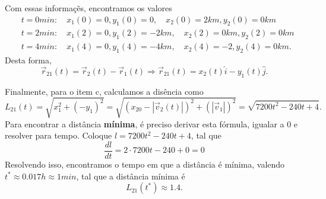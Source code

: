 \documentclass[PhysicsI/physics_notes.tex]{subfiles}
\begin{document}
\begin{example}
	Com essas informaç\~es, encontramos os valores
	\begin{align*}
		 & t = 0min:\quad x_{1}(0) = 0, y_{1}(0) = 0,\quad x_{2}(0) = 2km, y_{2}(0) = 0km    \\
		 & t = 2min:\quad x_{1}(2) = 0, y_{1}(2) = -2km,\quad x_{2}(2) = 0km, y_{2}(2) = 0km \\
		 & t = 4min:\quad x_{1}(4) = 0, y_{1}(4) = -4km,\quad x_{2}(4) = -2, y_{2}(4) = 0km.
	\end{align*}
	Desta forma,
	$$
		\vec{r}_{21}(t) = \vec{r}_{2}(t) - \vec{r}_{1}(t) \Rightarrow \vec{r}_{21}(t) = x_{2}(t)\hat{i} - y_{1}(t)\hat{j}.
	$$

	Finalmente, para o item c, calculamos a disência como
	$$
		L_{21}(t) = \sqrt{x_{1}^{2} + (-y_{1})^{2}} = \sqrt{(x_{20}-|\vec{v}_{2}(t)|)^{2} + (|\vec{v}_{1}|)^{2}} = \sqrt{7200t^{2} - 240t + 4}.
	$$
	Para encontrar a distância \textbf{mínima}, é preciso derivar esta fórmula, igualar a 0 e resolver para tempo. Coloque $l = 7200t^{2}-240t+4$,
	tal que
	$$
		\frac{dl}{dt} = 2 \cdot 7200t - 240 + 0 = 0
	$$
	Resolvendo isso, encontramos o tempo em que a distância é mínima, valendo $t^{*}\approx 0.017h\approx 1min$, tal que a distância mínima é
	$$
		L_{21}(t^{*})\approx 1.4.
	$$
\end{example}
\end{document}
